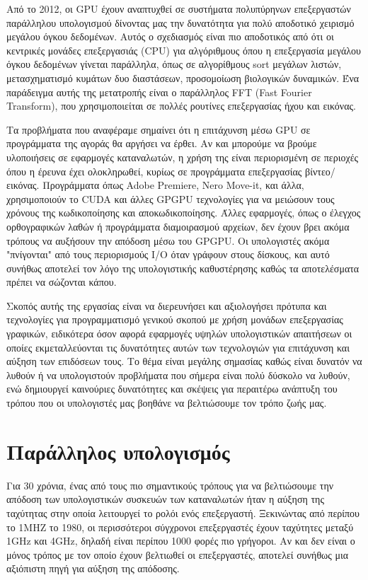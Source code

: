 Από το 2012, οι GPU έχουν αναπτυχθεί σε συστήματα πολυπύρηνων επεξεργαστών παράλληλου υπολογισμού δίνοντας μας την δυνατότητα για πολύ αποδοτικό χειρισμό μεγάλου όγκου δεδομένων. Αυτός ο σχεδιασμός είναι πιο αποδοτικός από ότι οι κεντρικές μονάδες επεξεργασιάς (CPU) για αλγόριθμους όπου η επεξεργασία μεγάλου όγκου δεδομένων γίνεται παράλληλα, όπως σε αλγορίθμους sort μεγάλων λιστών, μετασχηματισμό κυμάτων δυο διαστάσεων, προσομοίωση βιολογικών δυναμικών. Ένα παράδειγμα αυτής της μετατροπής είναι ο παράλληλος FFT (Fast Fourier Transform), που χρησιμοποιείται σε πολλές ρουτίνες επεξεργασίας ήχου και εικόνας.

Τα προβλήματα που αναφέραμε σημαίνει ότι η επιτάχυνση μέσω GPU σε προγράμματα της αγοράς θα αργήσει να έρθει. Αν και μπορούμε να βρούμε υλοποιήσεις σε εφαρμογές καταναλωτών, η χρήση της είναι περιορισμένη σε περιοχές όπου η έρευνα έχει ολοκληρωθεί, κυρίως σε προγράμματα επεξεργασίας βίντεο/εικόνας. Προγράμματα όπως Adobe Premiere, Nero Move-it, και άλλα, χρησιμοποιούν το CUDA και άλλες GPGPU τεχνολογίες για να μειώσουν τους χρόνους της κωδικοποίησης και αποκωδικοποίησης. Άλλες εφαρμογές, όπως ο έλεγχος ορθογραφικών λαθών ή προγράμματα διαμοιρασμού αρχείων, δεν έχουν βρει ακόμα τρόπους να αυξήσουν την απόδοση μέσω του GPGPU. Οι υπολογιστές ακόμα "πνίγονται" από τους περιορισμούς I/O όταν γράφουν στους δίσκους, και αυτό συνήθως αποτελεί τον λόγο της υπολογιστικής καθυστέρησης καθώς τα αποτελέσματα πρέπει να σώζονται κάπου.

Σκοπός αυτής της εργασίας είναι να διερευνήσει και αξιολογήσει πρότυπα και τεχνολογίες για προγραμματισμό γενικού σκοπού με χρήση μονάδων επεξεργασίας γραφικών, ειδικότερα όσον αφορά εφαρμογές υψηλών υπολογιστικών απαιτήσεων οι οποίες εκμεταλλεύονται τις δυνατότητες αυτών των τεχνολογιών για επιτάχυνση και αύξηση των επιδόσεων τους. Το θέμα είναι μεγάλης σημασίας καθώς είναι δυνατόν να λυθούν ή να υπολογιστούν προβλήματα που σήμερα είναι πολύ δύσκολο να λυθούν, ενώ δημιουργεί καινούριες δυνατότητες και σκέψεις για περαιτέρω ανάπτυξη του τρόπου που οι υπολογιστές μας βοηθάνε να βελτιώσουμε τον τρόπο ζωής μας.

\section*{Παράλληλος υπολογισμός}
Για 30 χρόνια, ένας από τους πιο σημαντικούς τρόπους για να βελτιώσουμε την απόδοση των υπολογιστικών συσκευών των καταναλωτών ήταν η αύξηση της ταχύτητας στην οποία λειτουργεί το ρολόι ενός επεξεργαστή. Ξεκινώντας από περίπου το 1MHZ το 1980, οι περισσότεροι σύγχρονοι επεξεργαστές έχουν ταχύτητες μεταξύ 1GHz και 4GHz, δηλαδή είναι περίπου 1000 φορές πιο γρήγοροι. Αν και δεν είναι ο μόνος τρόπος με τον οποίο έχουν βελτιωθεί οι επεξεργαστές, αποτελεί συνήθως μια αξιόπιστη πηγή για αύξηση της απόδοσης.

